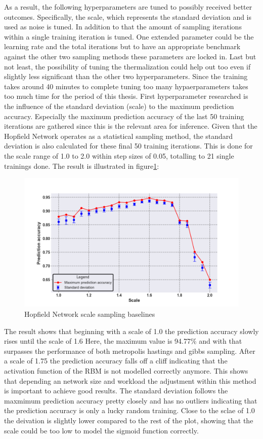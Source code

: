 As a result, the following hyperparameters are tuned to possibly received better outcomes. 
Specifically, the scale, which represents the standard deviation and is used as noise is tuned. 
In addition to that the amount of sampling iterations within a single training iteration is tuned.
One extended parameter could be the learning rate and the total iterations but to have an appropriate benchmark against the other two 
sampling methods these parameters are locked in. 
Last but not least, the possibility of tuning the thermalization could help out too even if slightly less significant than the other two hyperparameters.
Since the training takes around 40 minutes to complete tuning too many hypaerparameters takes too much time for the period of this thesis. 
First hyperparameter researched is the influence of the standard deviation (scale) to the maximum prediction accuracy. 
Especially the maximum prediction accuracy of the last 50 training iterations are gathered since this is the relevant area for inference.
Given that the Hopfield Network operates as a statistical sampling method, the standard deviation is also calculated for these final 50 training iterations.
This is done for the scale range of 1.0 to 2.0 within step sizes of 0.05, totalling to 21 single trainings done.
The result is illustrated in figure\ref{Hyperparamers_Scale_ohne}:
\begin{figure}[H]
    \centering
    \includegraphics[width=1\linewidth]{graphics/NEW_Scale_Ohne_N2_Half_Pred_Acc.png}
    \caption{Hopfield Network scale sampling baselines}
    \label{Hyperparamers_Scale_ohne}
\end{figure}
The result shows that beginning with a scale of 1.0 the prediction accuracy slowly rises until the scale of 1.6
Here, the maximum value is 94.77\% and with that surpasses the performance of both metropolis hastings and gibbs sampling. 
After a scale of 1.75 the prediction accuracy falls off a cliff indicating that the activation function of the \ac{RBM} is not modelled correctly anymore.
This shows that depending an network size and workload the adjustment within this method is important to achieve good results. 
The standard deviation follows the maxmimum prediction accuracy pretty closely and has no outliers indicating that the prediction accuracy is only a lucky random training.
Close to the sclae of 1.0 the deivation is slightly lower compared to the rest of the plot, showing that the scale could be too low to model the sigmoid function correctly. 

